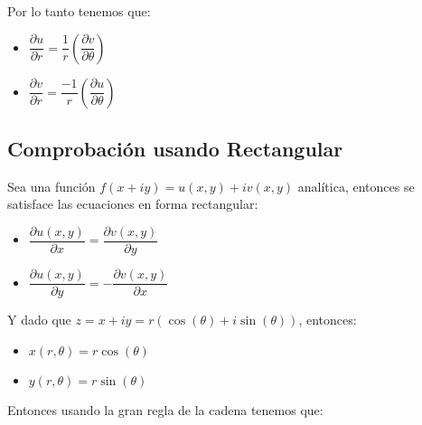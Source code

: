 \documentclass[12pt, fleqn]{report}                             %
\newcommand{\Wrap}[1]{\left( #1 \right)}                        %
\newcommand{\Cos}[1]{\cos\Wrap{#1}}                             %
\newcommand{\Sin}[1]{\sin\Wrap{#1}}                             %
\newcommand \Partial[2] {\dfrac{\partial #1}{\partial #2}}      %
\newcommand \Cis[1]  {\Cos{#1} + i \Sin{#1}}                    %
\begin{document}
                Por lo tanto tenemos que:
                \begin{itemize}
                    \item $\Partial{u}{r} = \dfrac{1}{r} \Wrap{\Partial{v}{\theta}} $
                    \item $\Partial{v}{r} = \dfrac{-1}{r}\Wrap{\Partial{u}{\theta}} $
                \end{itemize}



            \clearpage
            \subsection{Comprobación usando Rectangular}

                Sea una función $f(x+iy) = u(x, y) + iv(x, y)$ analítica, entonces se
                satisface las ecuaciones en forma rectangular:

                \begin{itemize}
                    \item $\Partial{u(x, y)}{x} =   \Partial{v(x, y)}{y}$
                    \item $\Partial{u(x, y)}{y} = - \Partial{v(x, y)}{x}$
                \end{itemize}

                Y dado que $z = x + iy = r(\Cis{\theta})$, entonces:

                \begin{itemize}
                    \item $x(r, \theta) = r\Cos{\theta}$
                    \item $y(r, \theta) = r\Sin{\theta}$
                \end{itemize}

                Entonces usando la gran regla de la cadena tenemos que:
\end{document}
